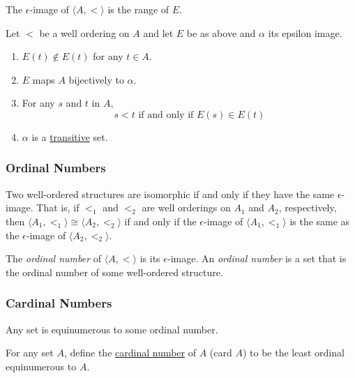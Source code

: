 \noindent The $\epsilon$-image of $\langle A, < \rangle$ is the range of $E$.

\begin{proposition}
Let $<$ be a well ordering on $A$ and let $E$ be as above and $\alpha$ its epsilon image.
\begin{enumerate}
  \item $E(t) \not\in E(t)$ for any $t \in A.$
  \item $E$ maps $A$ bijectively to $\alpha$.
  \item For any $s$ and $t$ in $A$,
  				$$s < t \textrm{  if and only if  } E(s) \in E(t)$$
  \item $\alpha$ is a \hyperref[transitiveset]{transitive} set.
\end{enumerate}
\end{proposition}

\subsubsection{Ordinal Numbers}\label{ordinalnumberdefinition}

\begin{proposition}
Two well-ordered structures are isomorphic if and only if they have the same $\epsilon$-image.
That is, if $<_1$ and $<_2$ are well orderings on $A_1$ and $A_2$, respectively, then $\langle A_1, <_1 \rangle \cong \langle A_2, <_2 \rangle$
if and only if the $\epsilon$-image of $\langle A_1, <_1 \rangle$ is the same as the $\epsilon$-image of $\langle A_2, <_2 \rangle$.
\end{proposition}

The \emph{ordinal number} of $\langle A, < \rangle$ is its $\epsilon$-image. An \emph{ordinal number} is a set that is the ordinal number of some well-ordered structure.

\subsubsection{Cardinal Numbers}\label{cardinalnumberdefinition}

\begin{theorem}
Any set is equinumerous to some ordinal number.
\end{theorem}

\noindent For any set $A$, define the \hyperref[cardinalnumbers]{cardinal number} of $A$ (card $A$) to be the least ordinal equinumerous to $A$.
